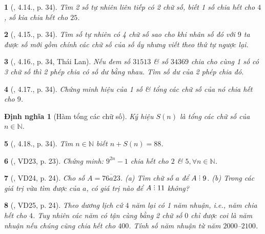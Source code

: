 \documentclass{article}
\newtheorem{baitoan}{}
\newtheorem{dinhnghia}{Định nghĩa}
\DeclareRobustCommand{\divby}{%
	\mathrel{\vbox{\baselineskip.65ex\lineskiplimit0pt\hbox{.}\hbox{.}\hbox{.}}}%
}
\begin{document}
\begin{baitoan}[\cite{Binh_boi_duong_Toan_6_tap_1}, 4.14., p. 34]
	Tìm 2 số tự nhiên liên tiếp có 2 chữ số, biết 1 số chia hết cho $4$, số kia chia hết cho $25$.
\end{baitoan}

\begin{baitoan}[\cite{Binh_boi_duong_Toan_6_tap_1}, 4.15., p. 34]
	Tìm số tự nhiên có 4 chữ số sao cho khi nhân số đó với $9$ ta được số mới gồm chính các chữ số của số ấy nhưng viết theo thứ tự ngược lại.
\end{baitoan}

\begin{baitoan}[\cite{Binh_boi_duong_Toan_6_tap_1}, 4.16., p. 34, Thái Lan]
	Nếu đem số $31513$ \& số $34369$ chia cho cùng 1 số có 3 chữ số thì 2 phép chia có số dư bằng nhau. Tìm số dư của 2 phép chia đó.
\end{baitoan}

\begin{baitoan}[\cite{Binh_boi_duong_Toan_6_tap_1}, 4.17., p. 34]
	Chứng minh hiệu của 1 số \& tổng các chữ số của nó chia hết cho $9$.
\end{baitoan}

\begin{dinhnghia}[Hàm tổng các chữ số]
	Ký hiệu $S(n)$ là tổng các chữ số của $n\in\mathbb{N}$.
\end{dinhnghia}

\begin{baitoan}[\cite{Binh_boi_duong_Toan_6_tap_1}, 4.18., p. 34]
	Tìm $n\in\mathbb{N}$ biết $n + S(n) = 88$.
\end{baitoan}

\begin{baitoan}[\cite{Tuyen_Toan_6}, VD23, p. 23]
	Chứng minh: $9^{2n} - 1$ chia hết cho $2$ \& $5,\forall n\in\mathbb{N}$.
\end{baitoan}

\begin{baitoan}[\cite{Tuyen_Toan_6}, VD24, p. 24]
	Cho số $A = \overline{76a23}$. (a) Tìm chữ số $a$ để $A\divby9$. (b) Trong các giá trị vừa tìm được của $a$, có giá trị nào để $A\divby11$ không?
\end{baitoan}

\begin{baitoan}[\cite{Tuyen_Toan_6}, VD25, p. 24]
	Theo dương lịch cứ $4$ năm lại có 1 năm nhuận, i.e., năm chia hết cho $4$. Tuy nhiên các năm có tận cùng bằng 2 chữ số $0$ chỉ được coi là năm nhuận nếu chúng cũng chia hết cho $400$. Tính số năm nhuận từ năm $2000$--$2100$.
\end{baitoan}
\end{document}
